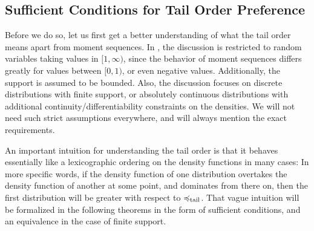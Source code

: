 \documentclass[a4paper,DIV=11,abstracton,twoside=semi]{scrreprt}
\theoremstyle{definition}
\begin{document}
    \subsection{Sufficient Conditions for Tail Order Preference}
    Before we do so, let us first get a better understanding of what the tail order means apart from moment sequences.
    In \cite{bib:rassGameRiskManagI}, the discussion is restricted to random variables taking values in $[1, \infty)$, since the behavior of moment sequences differs greatly for values between $[0, 1)$, or even negative values. Additionally, the support is assumed to be bounded. Also, the discussion focuses on discrete distributions with finite support, or absolutely continuous distributions with additional continuity/differentiability constraints on the densities.
    We will not need such strict assumptions everywhere, and will always mention the exact requirements.
    
    An important intuition for understanding the tail order is that it behaves essentially like a lexicographic ordering on the density functions in many cases: In more specific words, if the density function of one distribution overtakes the density function of another at some point, and dominates from there on, then the first distribution will be greater with respect to $\preccurlyeq_{\text{tail}}$.
    That vague intuition will be formalized in the following theorems in the form of sufficient conditions, and an equivalence in the case of finite support.
    
\end{document}
